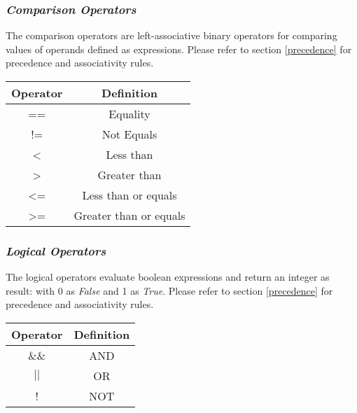         \subsubsection{\textit{Comparison Operators}}
        The comparison operators are left-associative binary operators for comparing values of operands defined as expressions. Please refer to section \ref{precedence} for precedence and associativity rules.
        \begin{center}
            \begin{tabular}{ |c|c| }
            \hline
                \textbf{Operator} & \textbf{Definition} \\
                \hline
                ==              & Equality \\
                !=              & Not Equals \\
                \textless       & Less than \\
                \textgreater    & Greater than \\
                \textless=      & Less than or equals \\
                \textgreater=   & Greater than or equals \\
            \hline
            \end{tabular}
        \end{center}
        
        \subsubsection{\textit{Logical Operators}}
        The logical operators evaluate boolean expressions and return an integer as result: with 0 as \textit{False} and 1 as \textit{True}. Please refer to section \ref{precedence} for precedence and associativity rules.
        \begin{center}
            \begin{tabular}{ |c|c| }
                \hline
                \textbf{Operator} & \textbf{Definition}\\
                \hline
                \&\&  & AND\\
                $||$  & OR\\
                !  & NOT\\
                \hline
            \end{tabular}
        \end{center}

